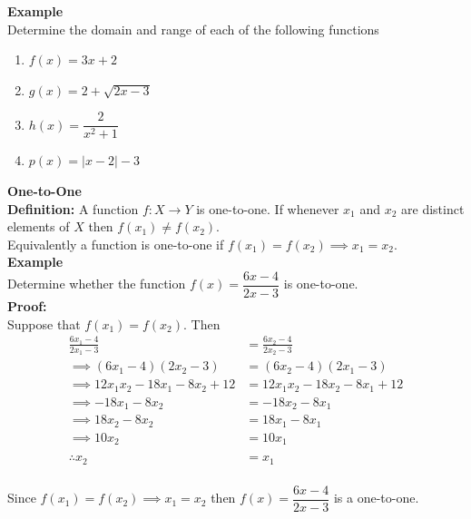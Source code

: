 \documentclass[11pt,a4paper]{article}
\begin{document}
\textbf{Example}\\
Determine the domain and range of each of the following functions
\begin{enumerate}
\item $f(x)=3x+2$
\item $g(x)=2+\sqrt{2x-3}$
\item $h(x)=\dfrac{2}{x^2+1}$
\item $p(x)=|x-2|-3$\\
\end{enumerate}


\textbf{One-to-One}\\
\textbf{Definition:} A function $f:X\longrightarrow Y$ is one-to-one. If whenever $x_1$ and $x_2$ are distinct elements of $X$ then $f(x_1)\neq f(x_2)$.\\

Equivalently a function is one-to-one if $f(x_1)=f(x_2)\implies x_1=x_2$.\\

\textbf{Example}\\
Determine whether the function $f(x)=\dfrac{6x-4}{2x-3}$ is one-to-one.\\

\textbf{Proof:}\\
Suppose that $f(x_1)=f(x_2).$ Then
\begin{align*}
\frac{6x_1-4}{2x_1-3} & = \frac{6x_2-4}{2x_2-3}\\
\implies (6x_1-4)(2x_2-3) & = (6x_2-4)(2x_1-3)\\
\implies 12x_1x_2-18x_1-8x_2+12 & = 12x_1x_2-18x_2-8x_1+12\\
\implies -18x_1-8x_2 & = -18x_2-8x_1\\
\implies 18x_2-8x_2 & = 18x_1-8x_1\\
\implies 10x_2 &=10x_1\\\\
\therefore x_2 &=x_1\\
\end{align*}

Since $f(x_1)=f(x_2)\implies x_1=x_2$ then $f(x)=\dfrac{6x-4}{2x-3}$ is a one-to-one.\\\\
\end{document}
